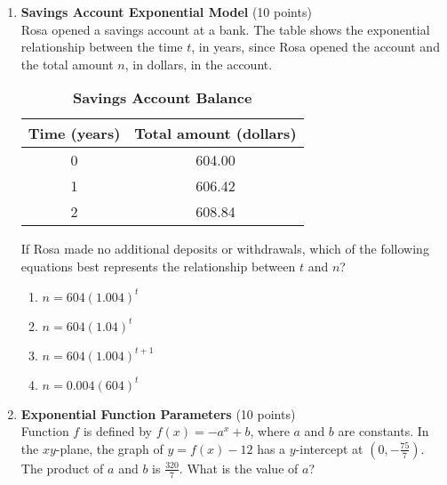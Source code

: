 \begin{enumerate}
  \item \textbf{Savings Account Exponential Model} (10 points)\\
  Rosa opened a savings account at a bank. The table shows the exponential relationship between the time $t$, in years, since Rosa opened the account and the total amount $n$, in dollars, in the account.
  \begin{table}[h!]
  \centering
  \renewcommand{\arraystretch}{1.3}
  \setlength{\tabcolsep}{8pt}
  \caption*{\textbf{Savings Account Balance}}
  \begin{tabular}{|c|c|}
  \hline
  \rowcolor[HTML]{E0E0E0}
  \textbf{Time (years)} & \textbf{Total amount (dollars)} \\
  \hline
  0 & 604.00 \\
  \hline
  1 & 606.42 \\
  \hline
  2 & 608.84 \\
  \hline
  \end{tabular}
  \end{table}
  If Rosa made no additional deposits or withdrawals, which of the following equations best represents the relationship between $t$ and $n$?
  \begin{enumerate}[label=(\Alph*)]
    \item $n=604(1.004)^t$
    \item $n=604(1.04)^t$
    \item $n=604(1.004)^{t+1}$
    \item $n=0.004(604)^t$
  \end{enumerate}
  \begin{subanswer}
  \end{subanswer}

  \item \textbf{Exponential Function Parameters} (10 points)\\
  Function $f$ is defined by $f(x)=-a^{x}+b$, where $a$ and $b$ are constants. In the $xy$-plane, the graph of $y=f(x)-12$ has a $y$-intercept at $\left(0,-\frac{75}{7}\right)$. The product of $a$ and $b$ is $\frac{320}{7}$. What is the value of $a$?
  \begin{subanswer}
  \end{subanswer}

  \newpage


\end{enumerate}

